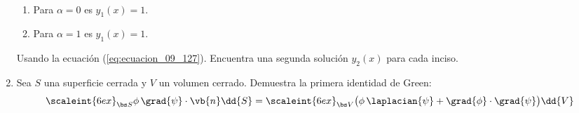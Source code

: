 \begin{enumerate}
\begin{align*}
\end{align*}
\begin{enumerate}[label=\alph*)]
\item Para $\alpha = 0$ es $y_{1} (x) = 1$.
\item Para $\alpha = 1$ es $y_{1} (x) = 1$.
\end{enumerate}
Usando la ecuación (\ref{eq:ecuacion_09_127}). Encuentra una segunda solución $y_{2}(x)$ para cada inciso.
\item Sea $S$ una superficie cerrada y $V$ un volumen cerrado. Demuestra la primera identidad de Green:
\begin{align*}
\scaleint{6ex}_{\bs S} \phi \, \grad{\psi} \cdot \vb{n} \dd{S} = \scaleint{6ex}_{\bs V} \big( \phi \, \laplacian{\psi} + \grad{\phi} \cdot \grad{\psi} \big) \dd{V}
\end{align*}
\end{enumerate}

